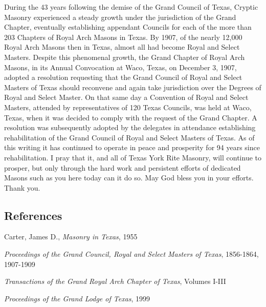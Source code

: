 \documentclass[letterpaper]{article}
\begin{document}
During the 43 years following the demise of the Grand Council of Texas, Cryptic Masonry experienced
a steady growth under the jurisdiction of the Grand Chapter, eventually establishing
appendant Councils for each of the more than 203 Chapters of Royal Arch Masons in Texas. By
1907, of the nearly 12,000 Royal Arch Masons then in Texas, almost all had become Royal and
Select Masters. Despite this phenomenal growth, the Grand Chapter of Royal Arch Masons, in its
Annual Convocation at Waco, Texas, on December 3, 1907, adopted a resolution requesting that
the Grand Council of Royal and Select Masters of Texas should reconvene and again take jurisdiction
over the Degrees of Royal and Select Master. On that same day a Convention of Royal and
Select Masters, attended by representatives of 120 Texas Councils, was held at Waco, Texas, when
it was decided to comply with the request of the Grand Chapter. A resolution was subsequently
adopted by the delegates in attendance establishing rehabilitation of the Grand Council of Royal
and Select Masters of Texas. As of this writing it has continued to operate in peace and prosperity
for 94 years since rehabilitation. I pray that it, and all of Texas York Rite Masonry, will continue
to prosper, but only through the hard work and persistent efforts of dedicated Masons such as you
here today can it do so. May God bless you in your efforts. Thank you.

\subsection*{References}

Carter, James D., \textit{Masonry in Texas}, 1955

\textit{Proceedings of the Grand Council, Royal and Select Masters of Texas}, 1856-1864, 1907-1909

\textit{Transactions of the Grand Royal Arch Chapter of Texas}, Volumes I-III

\textit{Proceedings of the Grand Lodge of Texas}, 1999
\end{document}
